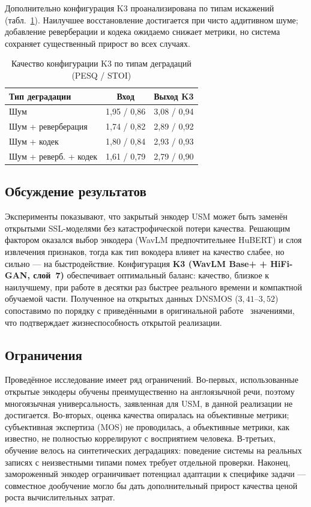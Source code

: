 Дополнительно конфигурация K3 проанализирована по типам искажений
(табл.~\ref{tab:ablation}). Наилучшее восстановление достигается при чисто
аддитивном шуме; добавление реверберации и кодека ожидаемо снижает метрики, но
система сохраняет существенный прирост во всех случаях.

\begin{table}[H]
    \caption{Качество конфигурации K3 по типам деградаций (PESQ / STOI)}
    \label{tab:ablation}
    \centering
    \footnotesize
    \begin{tabularx}{\textwidth}{X c c}
        \toprule
        Тип деградации & Вход & Выход K3 \\
        \midrule
        Шум                    & 1,95 / 0,86 & 3,08 / 0,94 \\
        Шум + реверберация     & 1,74 / 0,82 & 2,89 / 0,92 \\
        Шум + кодек            & 1,80 / 0,84 & 2,93 / 0,93 \\
        Шум + реверб. + кодек  & 1,61 / 0,79 & 2,79 / 0,90 \\
        \bottomrule
    \end{tabularx}
\end{table}

\subsection{Обсуждение результатов}

Эксперименты показывают, что закрытый энкодер USM может быть заменён открытыми
SSL-моделями без катастрофической потери качества. Решающим фактором оказался
выбор энкодера (WavLM предпочтительнее HuBERT) и слоя извлечения признаков, тогда
как тип вокодера влияет на качество слабее, но сильно --- на быстродействие.
Конфигурация \textbf{K3 (WavLM Base+ + HiFi-GAN, слой~7)} обеспечивает
оптимальный баланс: качество, близкое к наилучшему, при работе в десятки раз
быстрее реального времени и компактной обучаемой части. Полученное на открытых
данных DNSMOS ($3{,}41$--$3{,}52$) сопоставимо по порядку с приведёнными в
оригинальной работе~\cite{miipher2} значениями, что подтверждает
жизнеспособность открытой реализации.

\subsection{Ограничения}

Проведённое исследование имеет ряд ограничений. Во-первых, использованные
открытые энкодеры обучены преимущественно на англоязычной речи, поэтому
многоязычная универсальность, заявленная для USM, в данной реализации не
достигается. Во-вторых, оценка качества опиралась на объективные метрики;
субъективная экспертиза (MOS) не проводилась, а объективные метрики, как
известно, не полностью коррелируют с восприятием человека. В-третьих, обучение
велось на синтетических деградациях: поведение системы на реальных записях с
неизвестными типами помех требует отдельной проверки. Наконец, замороженный
энкодер ограничивает потенциал адаптации к специфике задачи --- совместное
дообучение могло бы дать дополнительный прирост качества ценой роста
вычислительных затрат.
